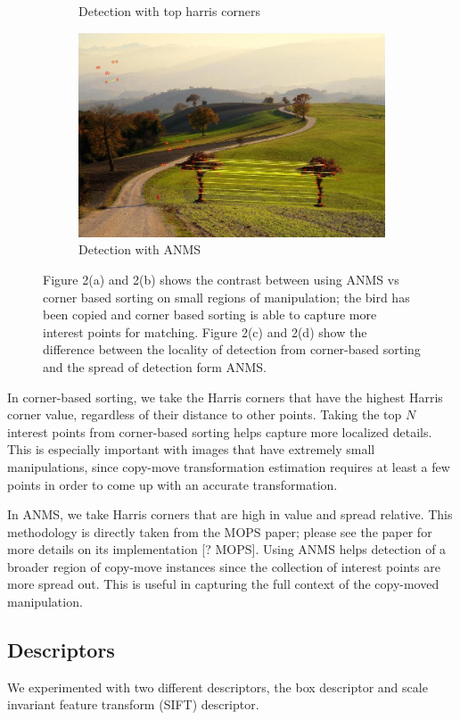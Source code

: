 \documentclass[12pt]{article}
\begin{document}
\begin{figure}
\begin{subfigure}{.5\textwidth}
  \caption{Detection with top harris corners}
  \label{fig:sub1}
\end{subfigure}%
\begin{subfigure}{.5\textwidth}
  \centering
  \includegraphics[width=.8\linewidth]{./gfx/ip_anms.jpg}
  \caption{Detection with ANMS}
  \label{fig:sub2}
\end{subfigure}
\caption{Figure 2(a) and 2(b) shows the contrast between using ANMS vs corner based sorting on small regions of manipulation; the bird has been copied and corner based sorting is able to capture more interest points for matching. Figure 2(c) and 2(d) show the difference between the locality of detection from corner-based sorting and the spread of detection form ANMS.}
\label{fig:test}
\end{figure}

In corner-based sorting, we take the Harris corners that have the highest Harris corner value, regardless of their distance to other points. Taking the top $N$ interest points from corner-based sorting helps capture more localized details. This is especially important with images that have extremely small manipulations, since copy-move transformation estimation requires at least a few points in order to come up with an accurate transformation.

In ANMS, we take Harris corners that are high in value and spread relative. This methodology is directly taken from the MOPS paper; please see the paper for more details on its implementation [? MOPS]. Using ANMS helps detection of a broader region of copy-move instances since the collection of interest points are more spread out. This is useful in capturing the full context of the copy-moved manipulation.

\subsection*{Descriptors}
We experimented with two different descriptors, the box descriptor and scale invariant feature transform (SIFT) descriptor.
\end{document}
